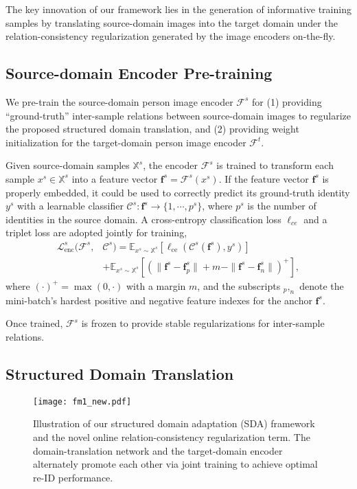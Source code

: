 \documentclass[journal]{IEEEtran}
\def\vf{{\bm{f}}}
\def\sX{{\mathbb{X}}}
\begin{document}
The key innovation of our framework lies in the generation of informative training samples by translating source-domain images into the target domain under the relation-consistency regularization generated by the image encoders on-the-fly.


\subsection{Source-domain Encoder Pre-training}
\label{sec:reid}

We pre-train the source-domain person image encoder $\mathcal{F}^s$
for (1) providing ``ground-truth'' inter-sample relations between source-domain images to regularize the proposed structured domain translation, and
(2) providing weight initialization for the target-domain person image encoder $\mathcal{F}^t$.

Given source-domain samples $\sX^s$, the encoder $\mathcal{F}^s$ is trained to transform each sample $x^s \in \sX^s$ into a feature vector $\vf^s=\mathcal{F}^s(x^s)$.
If the feature vector $\vf^s$ is properly embedded, it could be used to correctly predict its ground-truth identity $y^s$ with a learnable classifier $\mathcal{C}^s: \vf^s \to \{1,\cdots,p^s \}$, where $p^s$ is the number of identities in the source domain.
A cross-entropy classification loss $\ell_{ce}$ and a triplet loss \cite{hermans2017defense} are adopted jointly for training,
{
\begin{align}
\label{eq:source}
\mathcal{L}_\text{enc}^s(\mathcal{F}^s,&\mathcal{C}^s) =
\mathbb{E}_{x^s \sim \sX^s}\left[ \ell_\text{ce} ( \mathcal{C}^s(\vf^s), y^s  )\right] \nonumber \\
&+
\mathbb{E}_{x^s \sim \sX^s}\left[
(\|\vf^s-\vf^s_p\| + m
 - \|\vf^s-\vf^s_n\| )^+\right],
\end{align}}where
$(\cdot)^+=\max(0,\cdot)$ with a margin $m$, and the subscripts $_p, _n$ denote the mini-batch's hardest positive and negative feature indexes for the anchor $\vf^s$.

Once trained, $\mathcal{F}^s$ is frozen to provide stable regularizations for inter-sample relations.

\subsection{Structured Domain Translation}
\label{sec:sdt}

\begin{figure}[t]
\centering
\texttt{[image: fm1\_new.pdf]}
\caption{Illustration of our structured domain adaptation (SDA) framework and the novel online relation-consistency regularization term.
The domain-translation network and the target-domain encoder alternately promote each other via joint training to achieve optimal re-ID performance. }
\label{fig:fm}
\end{figure}
\end{document}
